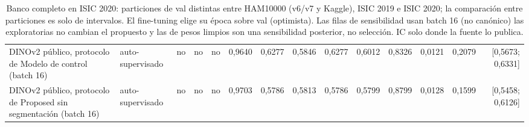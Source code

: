 \begin{table}[ht]
\begin{tabular}{@{}lllllrrrrrrrrr@{}}
DINOv2 público, protocolo de Modelo de control (batch 16) & auto-supervisado & no & no & no & 0,9640 & 0,6277 & 0,5846 & 0,6277 & 0,6012 & 0,8326 & 0,0121 & 0,2079 & [0,5673; 0,6331] \\
DINOv2 público, protocolo de Proposed sin segmentación (batch 16) & auto-supervisado & no & no & no & 0,9703 & 0,5786 & 0,5813 & 0,5786 & 0,5799 & 0,8799 & 0,0128 & 0,1599 & [0,5458; 0,6126] \\
\bottomrule
\end{tabular}
\caption{Banco completo en ISIC 2020: particiones de val distintas entre HAM10000 (v6/v7 y Kaggle), ISIC 2019 e ISIC 2020; la comparación entre particiones es solo de intervalos. El fine-tuning elige su época sobre val (optimista). Las filas de sensibilidad usan batch 16 (no canónico) las exploratorias no cambian el propuesto y las de pesos limpios son una sensibilidad posterior, no selección. IC solo donde la fuente lo publica.}
\label{tab:bench-isic2020}
\end{table}
